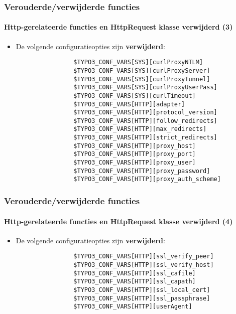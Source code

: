 \begin{frame}[fragile]
	\frametitle{Verouderde/verwijderde functies}
	\framesubtitle{Http-gerelateerde functies en HttpRequest klasse verwijderd (3)}

	\begin{itemize}

		\item De volgende configuratieopties zijn \textbf{verwijderd}:
			\begin{lstlisting}
				$TYPO3_CONF_VARS[SYS][curlProxyNTLM]
				$TYPO3_CONF_VARS[SYS][curlProxyServer]
				$TYPO3_CONF_VARS[SYS][curlProxyTunnel]
				$TYPO3_CONF_VARS[SYS][curlProxyUserPass]
				$TYPO3_CONF_VARS[SYS][curlTimeout]
				$TYPO3_CONF_VARS[HTTP][adapter]
				$TYPO3_CONF_VARS[HTTP][protocol_version]
				$TYPO3_CONF_VARS[HTTP][follow_redirects]
				$TYPO3_CONF_VARS[HTTP][max_redirects]
				$TYPO3_CONF_VARS[HTTP][strict_redirects]
				$TYPO3_CONF_VARS[HTTP][proxy_host]
				$TYPO3_CONF_VARS[HTTP][proxy_port]
				$TYPO3_CONF_VARS[HTTP][proxy_user]
				$TYPO3_CONF_VARS[HTTP][proxy_password]
				$TYPO3_CONF_VARS[HTTP][proxy_auth_scheme]
			\end{lstlisting}
	\end{itemize}

\end{frame}


\begin{frame}[fragile]
	\frametitle{Verouderde/verwijderde functies}
	\framesubtitle{Http-gerelateerde functies en HttpRequest klasse verwijderd (4)}

	\begin{itemize}

		\item De volgende configuratieopties zijn \textbf{verwijderd}:
			\begin{lstlisting}
				$TYPO3_CONF_VARS[HTTP][ssl_verify_peer]
				$TYPO3_CONF_VARS[HTTP][ssl_verify_host]
				$TYPO3_CONF_VARS[HTTP][ssl_cafile]
				$TYPO3_CONF_VARS[HTTP][ssl_capath]
				$TYPO3_CONF_VARS[HTTP][ssl_local_cert]
				$TYPO3_CONF_VARS[HTTP][ssl_passphrase]
				$TYPO3_CONF_VARS[HTTP][userAgent]
			\end{lstlisting}
	\end{itemize}

\end{frame}

